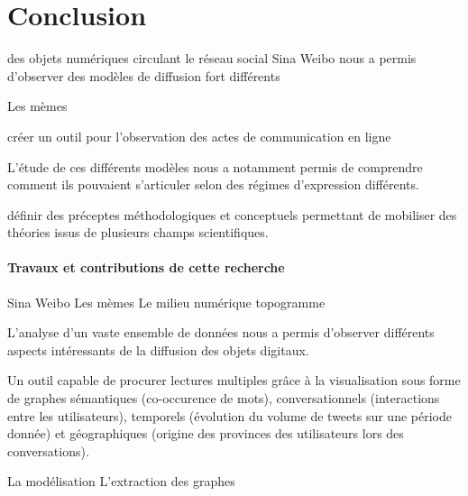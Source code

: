 \chapter*{Conclusion}


 des objets numériques circulant le réseau social Sina Weibo nous a permis d'observer des modèles de diffusion fort différents

Les mèmes


créer un outil pour l'observation des actes de communication en ligne

L'étude de ces différents modèles nous a notamment permis de comprendre comment ils pouvaient s'articuler selon des régimes d'expression différents.

définir des préceptes méthodologiques et conceptuels permettant de mobiliser des théories issus de plusieurs champs scientifiques.


\subsubsection[Travaux et contributions de cette recherche]{Travaux et contributions de cette recherche}

Sina Weibo
Les mèmes
Le milieu numérique
topogramme

L'analyse d'un vaste ensemble de données nous a permis d'observer différents aspects intéressants de la diffusion des objets digitaux.

Un outil capable de procurer lectures multiples grâce à la visualisation sous forme de graphes sémantiques (co-occurence de mots), conversationnels (interactions entre les utilisateurs), temporels (évolution du volume de tweets sur une période donnée) et géographiques (origine des provinces des utilisateurs lors des conversations). 

La modélisation
L'extraction des graphes



